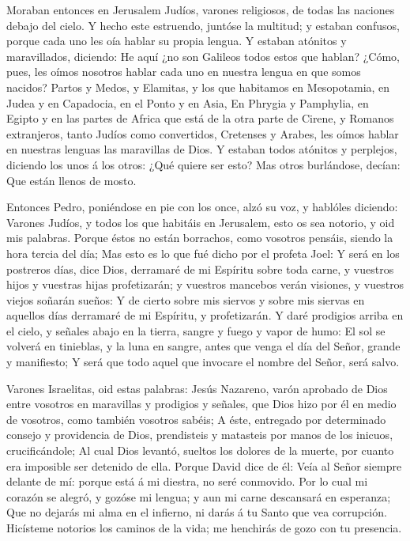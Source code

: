  Moraban entonces en Jerusalem Judíos, varones religiosos,
de todas las naciones debajo del cielo.  Y hecho este
estruendo, juntóse la multitud; y estaban confusos, porque cada uno les
oía hablar su propia lengua.  Y estaban atónitos y
maravillados, diciendo: He aquí ¿no son Galileos todos estos que hablan?
 ¿Cómo, pues, les oímos nosotros hablar cada uno en nuestra
lengua en que somos nacidos?  Partos y Medos, y Elamitas, y
los que habitamos en Mesopotamia, en Judea y en Capadocia, en el Ponto y
en Asia,  En Phrygia y Pamphylia, en Egipto y en las partes
de Africa que está de la otra parte de Cirene, y Romanos extranjeros,
tanto Judíos como convertidos,  Cretenses y Arabes, les
oímos hablar en nuestras lenguas las maravillas de Dios.  Y
estaban todos atónitos y perplejos, diciendo los unos á los otros: ¿Qué
quiere ser esto?  Mas otros burlándose, decían: Que están
llenos de mosto.

 Entonces Pedro, poniéndose en pie con los once, alzó su
voz, y hablóles diciendo: Varones Judíos, y todos los que habitáis en
Jerusalem, esto os sea notorio, y oid mis palabras.  Porque
éstos no están borrachos, como vosotros pensáis, siendo la hora tercia
del día;  Mas esto es lo que fué dicho por el profeta Joel:
 Y será en los postreros días, dice Dios, derramaré de mi
Espíritu sobre toda carne, y vuestros hijos y vuestras hijas
profetizarán; y vuestros mancebos verán visiones, y vuestros viejos
soñarán sueños:  Y de cierto sobre mis siervos y sobre mis
siervas en aquellos días derramaré de mi Espíritu, y profetizarán.
 Y daré prodigios arriba en el cielo, y señales abajo en la
tierra, sangre y fuego y vapor de humo:  El sol se volverá
en tinieblas, y la luna en sangre, antes que venga el día del Señor,
grande y manifiesto;  Y será que todo aquel que invocare el
nombre del Señor, será salvo.

 Varones Israelitas, oid estas palabras: Jesús Nazareno,
varón aprobado de Dios entre vosotros en maravillas y prodigios y
señales, que Dios hizo por él en medio de vosotros, como también
vosotros sabéis;  A éste, entregado por determinado consejo
y providencia de Dios, prendisteis y matasteis por manos de los inicuos,
crucificándole;  Al cual Dios levantó, sueltos los dolores
de la muerte, por cuanto era imposible ser detenido de ella.
 Porque David dice de él: Veía al Señor siempre delante de
mí: porque está á mi diestra, no seré conmovido.  Por lo
cual mi corazón se alegró, y gozóse mi lengua; y aun mi carne descansará
en esperanza;  Que no dejarás mi alma en el infierno, ni
darás á tu Santo que vea corrupción.  Hicísteme notorios
los caminos de la vida; me henchirás de gozo con tu presencia.

